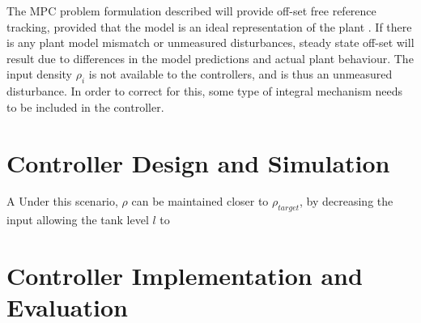 \documentclass[preprint,authoryear,12pt]{elsarticle}
\begin{document}
The MPC problem formulation described will provide off-set free reference tracking, provided that the model is an ideal representation of the plant \citep{Mayne2009}. If there is any plant model mismatch or unmeasured disturbances, steady state off-set will result due to differences in the model predictions and actual plant behaviour. The input density $\rho_i$ is not available to the controllers, and is thus an unmeasured disturbance. In order to correct for this, some type of integral mechanism needs to be included in the controller.


\section{Controller Design and Simulation}\label{sec:ControllerDesignAndSimulation}
A Under this scenario, $\rho$ can be maintained closer to $\rho_{target}$, by decreasing the input allowing the tank level $l$ to 


\section{Controller Implementation and Evaluation}\label{sec:ControllerImplementationAndEvaluation}








\end{document}
